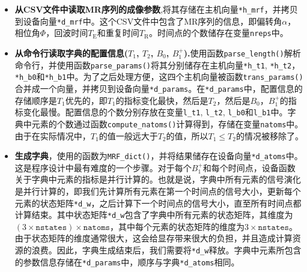 \begin{itemize}
\item \textbf{从CSV文件中读取MR序列的成像参数},将其存储在主机向量\texttt{*h\_mrf}，并拷贝到设备向量\texttt{*d\_mrf}中。这个CSV文件中包含了MR序列的信息，即偏转角$\alpha$，相位角$\Phi$，回波时间$T_\mathrm{E}$和重复时间$T_\mathrm{R}$。时间点的个数储存在变量\texttt{nreps}中。

\item \textbf{从命令行读取字典的配置信息($T_1$, $T_2$, $B_0$, $B_1^+$).}使用函数\texttt{parse\_length()}解析命令行，并使用函数\texttt{parse\_params()}将其分别储存在主机向量\texttt{*h\_t1}, \texttt{*h\_t2}，\texttt{*h\_b0}和\texttt{*h\_b1}中。为了之后处理方便，这四个主机向量被函数\texttt{trans\_params()}合并成一个向量，并拷贝到设备向量\texttt{*d\_params}。在\texttt{*d\_params}中，配置信息的存储顺序是$T_1$优先的，即$T_1$的指标变化最快，然后是$T_2$，然后是$B_0$，$B_1^+$的指标变化最慢。配置信息的个数分别存放在变量\texttt{l\_t1}, \texttt{l\_t2}, \texttt{l\_b0}和\texttt{l\_b1}中。字典中元素的个数通过函数\texttt{compute\_natoms()}计算得到，存储在变量\texttt{natoms}中。由于在实际情况中，$T_1$的值一般远大于$T_2$的值，所以$T_1 \le T_2$的情况被移除了。

\item \textbf{生成字典}，使用的函数为\texttt{MRF\_dict()}，并将结果储存在设备向量\texttt{*d\_atoms}中。这是程序设计中最有难度的一个步骤。对于每个$B_1^+$和每个时间点，设备函数关于字典中元素的指标是并行计算的。也就是说，字典中所有元素的信号演化是并行计算的，即我们先计算所有元素在第一个时间点的信号大小，更新每个元素的状态矩阵\texttt{*d\_w}，之后计算下一个时间点的信号大小，直至所有时间点都计算结束。其中状态矩阵\texttt{*d\_w}包含了字典中所有元素的状态矩阵，其维度为$(3\times \texttt{nstates})\times \texttt{natoms}$，其中每个元素的状态矩阵的维度为$3\times \texttt{nstates}$。由于状态矩阵的维度通常很大，这会给显存带来很大的负担，并且造成计算资源的浪费。因此，字典生成结束后，我们需要将\texttt{*d\_w}释放。字典中元素所包含的参数信息存储在\texttt{*d\_params}中，顺序与字典\texttt{*d\_atoms}相同。


\end{itemize}
